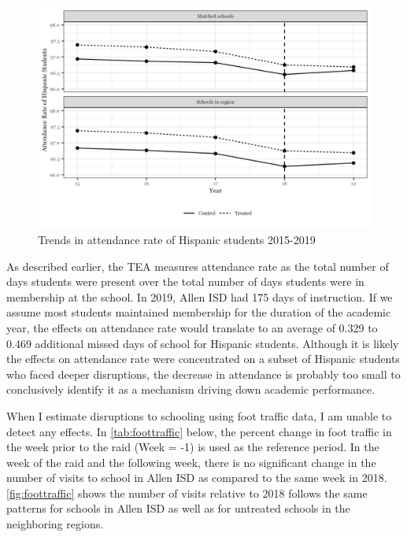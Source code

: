 \documentclass[hidelinks,twoside]{article}
\begin{document}
\begin{figure}[htbp]
\caption{{Trends in attendance rate of Hispanic students 2015-2019}}
\centerline{\includegraphics[scale=.7]{did_trends_attendance_rate.png}}
\end{figure}

As described earlier, the TEA measures attendance rate as the total number of days students were present over the total number of days students were in membership at the school. In 2019, Allen ISD had 175 days of instruction. If we assume most students maintained membership for the duration of the academic year, the effects on attendance rate would translate to an average of 0.329 to 0.469 additional missed days of school for Hispanic students. Although it is likely the effects on attendance rate were concentrated on a subset of Hispanic students who faced deeper disruptions, the decrease in attendance is probably too small to conclusively identify it as a mechanism driving down academic performance. 

When I estimate disruptions to schooling using foot traffic data, I am unable to detect any effects. In \autoref{tab:foottraffic} below, the percent change in foot traffic in the week prior to the raid (Week = -1) is used as the reference period. In the week of the raid and the following week, there is no significant change in the number of visits to school in Allen ISD as compared to the same week in 2018. \autoref{fig:foottraffic} shows the number of visits relative to 2018 follows the same patterns for schools in Allen ISD as well as for untreated schools in the neighboring regions. 
\end{document}
